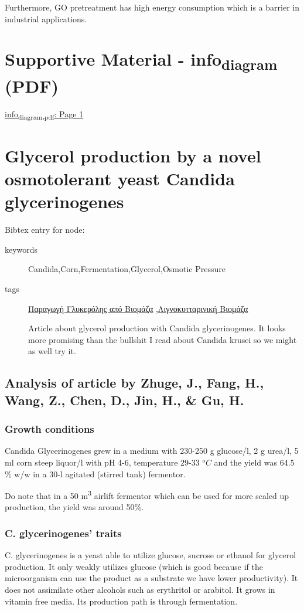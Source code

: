 \documentclass[11pt]{article}
\begin{document}
Furthermore, GO pretreatment has high energy consumption which is a barrier in industrial applications.

\section{Supportive Material - info\textsubscript{diagram} (PDF)}
\label{sec:org0164808}
\href{\detokenize{file:///home/vidianos/Documents/7o_εξάμηνο/Σχεδιασμός_Ι/Project/info_diagram.pdf}}{info\textsubscript{diagram.pdf}: Page 1}

\section{Glycerol production by a novel osmotolerant yeast Candida glycerinogenes}
\label{sec:org0723e75}
Bibtex entry for node: \cite{zhugeGlycerolProductionNovel2001}

\begin{description}
\item[{keywords}] Candida,Corn,Fermentation,Glycerol,Osmotic Pressure
\item[{tags}] \href{\detokenize{../../../../org_roam/παραγωγη_γλυκερολης_απο_βιομαζα-13-10-22.org}}{Παραγωγή Γλυκερόλης από Βιομάζα} ,\href{\detokenize{../../../../org_roam/λιγνοκυτταρινικη_βιομαζα-09-11-22.org}}{Λιγνοκυτταρινική Βιομάζα} 

Article about glycerol production with Candida glycerinogenes. It looks more promising than the bullshit I read about Candida krusei so we might as well try it.
\end{description}
\subsection{Analysis of article by Zhuge, J., Fang, H., Wang, Z., Chen, D., Jin, H., \& Gu, H.}
\label{sec:orge3e67f9}
\subsubsection{Growth conditions}
\label{sec:org016a008}
Candida Glycerinogenes grew in a medium with 230-250 g glucose/l, 2 g urea/l, 5 ml corn steep liquor/l with pH 4-6, temperature 29-33 \(^oC\) and the yield was 64.5 \% w/w in a 30-l agitated (stirred tank) fermentor.

Do note that in a 50 m\textsuperscript{3} airlift fermentor which can be used for more scaled up production, the yield was around 50\%.

\subsubsection{C. glycerinogenes' traits}
\label{sec:org0e81c95}
C. glycerinogenes is a yeast able to utilize glucose, sucrose or ethanol for glycerol production. It only weakly utilizes glucose (which is good because if the microorganism can use the product as a substrate we have lower productivity). It does not assimilate other alcohols such as erythritol or arabitol. It grows in vitamin free media. Its production path is through fermentation.
\end{document}
